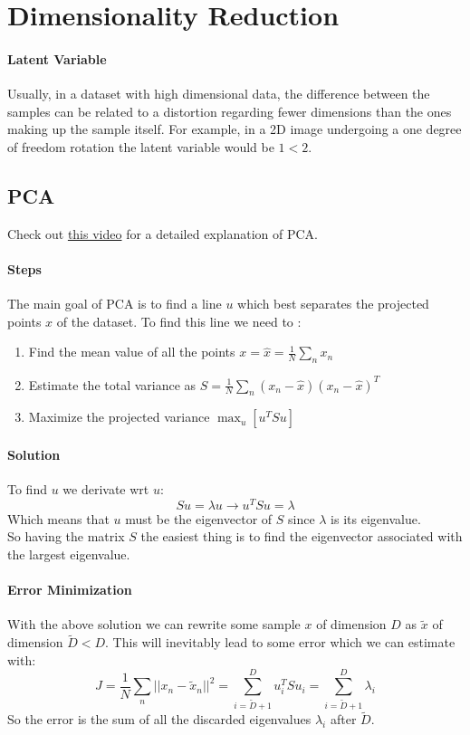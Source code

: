 \section{Dimensionality Reduction}

\paragraph{Latent Variable}
Usually, in a dataset with  high dimensional data, the difference between the samples can be related to a distortion regarding fewer dimensions than the ones making up the sample itself. For example, in a 2D image undergoing a one degree of freedom rotation the latent variable would be $1 < 2$.\\

\subsection{PCA} 
Check out \href{https://www.youtube.com/watch?v=FgakZw6K1QQ}{this video} for a detailed explanation of PCA.\\

\paragraph{Steps}
The main goal of PCA is to find a line $u$ which best separates the projected points $x$ of the dataset. To find this line we need to :
\begin{enumerate}
\item Find the mean value of all the points $x=\hat{x}=\frac{1}{N}\sum_nx_n$
\item Estimate the total variance as $S=\frac{1}{N}\sum_n(x_n-\hat{x})(x_n-\hat{x})^T$
\item Maximize the projected variance $\max_{u}[u^TSu]$ 
\end{enumerate}

\paragraph{Solution}
To find $u$ we derivate wrt $u$:
$$S u=\lambda u \to u^TSu=\lambda$$
Which means that $u$ must be the eigenvector of $S$ since $\lambda$ is its eigenvalue.\\
So having the matrix $S$ the easiest thing is to find the eigenvector associated with the largest eigenvalue.

\paragraph{Error Minimization}
With the above solution we can rewrite some sample $x$ of dimension $D$ as $\tilde{x}$ of dimension $\tilde{D}<D$. This will inevitably lead to some error which we can estimate with:
$$J=\frac{1}{N}\sum_n ||x_n-\tilde{x}_n||^2=\sum_{i=\tilde{D}+1}^D u_i^T S u_i=\sum_{i=\tilde{D}+1}^D \lambda_i$$
So the error is the sum of all the discarded eigenvalues $\lambda_i$ after $\tilde{D}$.

